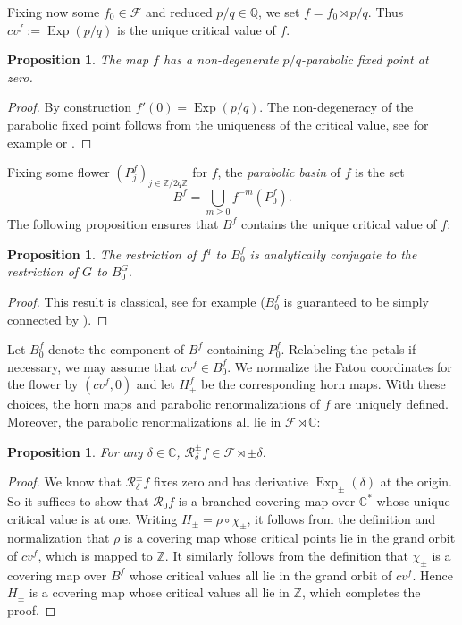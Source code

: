 \documentclass[12pt,letterpaper]{amsart}
\numberwithin{equation}{section}
\newtheorem{proposition}[equation]{Proposition}
\theoremstyle{remark}
\theoremstyle{definition}
\newcommand{\C}{\mathbb C}
\newcommand{\Q}{\mathbb Q}
\newcommand{\Z}{\mathbb Z}
\newcommand{\FF}{\mathcal F}
\newcommand{\RR}{\mathcal R}
\DeclareMathOperator{\Exp}{Exp}
\begin{document}
	Fixing now  some $f_0\in \mathcal{F}$ and reduced $p/q\in \Q$, we set $f=f_0\rtimes p/q$. Thus $cv^f:=\Exp(p/q)$ is the unique critical value of $f$.
	\begin{proposition}
		 The map $f$ has a non-degenerate $p/q$-parabolic fixed point at zero.
	\end{proposition}
	
	\begin{proof}
		By construction $f'(0) = \Exp(p/q)$. The non-degeneracy of the parabolic fixed point follows from the uniqueness of the critical value, see for example  \cite[Theorem 10.15]{Milnor} or \cite[Lemma 4.5.2]{shishikura_1}.
	\end{proof}
	
	
	Fixing some flower  $(P_j^f)_{j\in \Z/2q\Z}$ for $f$, the \textit{parabolic basin} of $f$ is the set
	$$B^{f} = \bigcup_{m\geq 0}f^{-m}(P_{0}^{f}).$$
	The following proposition ensures that $B^f$ contains the unique critical value of $f$: 
	\begin{proposition}\label{universal cauliflower}
		The restriction of $f^q$ to $B_0^{f}$ is analytically conjugate to the restriction of $G$ to $B_0^G.$
	\end{proposition}
	\begin{proof}
		This result is classical, see for example \cite[Theorem 2.9]{lanford} ($B_0^f$ is guaranteed to be simply connected by \cite[Lemma 4.5.2]{shishikura_1}).
	\end{proof}
	
	
	Let $B_0^f$ denote the component of $B^f$ containing $P_0^f$. Relabeling the petals if necessary, we may assume that $cv^f\in B_0^f$. We normalize the Fatou coordinates for the flower by $(cv^f, 0)$ and let $H_\pm^f$ be the corresponding horn maps.
	With these choices, the horn maps and parabolic renormalizations of $f$ are uniquely defined. Moreover, the parabolic renormalizations all lie in $\FF\rtimes \C$:
	
	\begin{proposition}\label{invariance of f}
		For any $\delta\in \C$,  $\RR_\delta^\pm f\in \mathcal{F}\rtimes \pm\delta$.
	\end{proposition}
	
	\begin{proof}
		We know that $\RR_\delta^\pm f$ fixes zero and has derivative $\Exp_\pm(\delta)$ at the origin. So it suffices to show that $\RR_0 f$ is a branched covering map over $\C^*$ whose unique critical value is at one. 
		Writing $H_\pm = \rho\circ \chi_\pm$, it follows from the definition and normalization that $\rho$ is a covering map whose critical points lie in the grand orbit of $cv^f$, which is mapped to $\Z$. 
		It similarly follows from the definition that $\chi_\pm$ is a covering map over $B^f$ whose critical values all lie in the grand orbit of $cv^f$. 
		Hence $H_\pm$ is a covering map whose critical values all lie in $\Z$, which completes the proof.
	\end{proof}
	
\end{document}
